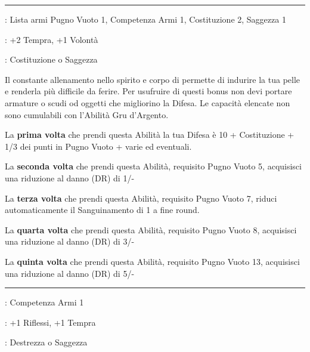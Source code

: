 \begin{multicols}{2}
\smallskip\noindent\rule{\linewidth}{2pt} \hypertarget{Armatura della Montagna Incantata}{}\medskip{}
\noindent
\begin{description}[noitemsep, topsep=0pt, parsep=0pt, partopsep=0pt, leftmargin=0cm, labelwidth=2.5cm]
    \item[\textbf{Requisito}]: Lista armi Pugno Vuoto 1, Competenza Armi 1, Costituzione 2, Saggezza 1
    \item[\textbf{Tiri Salvezza}]: +2 Tempra, +1 Volontà
    \item[\textbf{Caratteristica}]: Costituzione o Saggezza
\end{description}

Il constante allenamento nello spirito e corpo di permette di indurire la tua pelle e renderla più difficile da ferire. Per usufruire di questi bonus non devi portare armature o scudi od oggetti che migliorino la Difesa. Le capacità elencate non sono cumulabili con l'Abilità Gru d'Argento.

La \textbf{prima volta} che prendi questa Abilità la tua Difesa è 10 + Costituzione + 1/3 dei punti in Pugno Vuoto + varie ed eventuali.

La \textbf{seconda volta} che prendi questa Abilità, requisito Pugno Vuoto 5, acquisisci una riduzione al danno (DR) di 1/-

La \textbf{terza volta} che prendi questa Abilità, requisito Pugno Vuoto 7, riduci automaticamente il Sanguinamento di 1 a fine round.

La \textbf{quarta volta} che prendi questa Abilità, requisito Pugno Vuoto 8, acquisisci una riduzione al danno (DR) di 3/-

La \textbf{quinta volta} che prendi questa Abilità, requisito Pugno Vuoto 13, acquisisci una riduzione al danno (DR) di 5/-

\smallskip\noindent\rule{\linewidth}{2pt} \hypertarget{Arciere su saurovallo}{}\medskip{}
\noindent
\begin{description}[noitemsep, topsep=0pt, parsep=0pt, partopsep=0pt, leftmargin=0cm, labelwidth=2.5cm]
    \item[\textbf{Requisito}]: Competenza Armi 1
    \item[\textbf{Tiri Salvezza}]: +1 Riflessi, +1 Tempra
    \item[\textbf{Caratteristica}]: Destrezza o Saggezza
\end{description}


\end{multicols}

